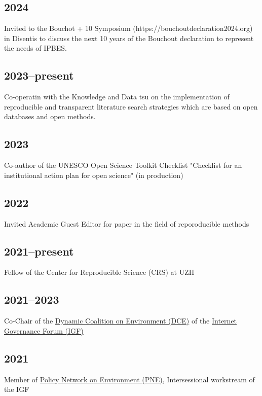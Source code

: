 \documentclass[a4paper]{article}
\begin{document}
\subsection{2024} Invited to the Bouchot + 10 Symposium 
(https://bouchoutdeclaration2024.org) in Disentis to discuss the next 10 years 
of the Bouchout declaration to represent the needs of IPBES. 

\subsection{2023--present} Co-operatin with the Knowledge and Data tsu on the 
	implementation of reproducible and transparent literature search strategies 
	which are based on open databases and open methods.

\subsection{2023}
Co-author of the UNESCO Open Science Toolkit Checklist "Checklist for an
institutional action plan for open science" (in production)

\subsection{2022}
Invited Academic Guest Editor for paper in the field of reporoducible methods

\subsection{2021--present}
Fellow of the Center for Reproducible Science (CRS) at UZH

\subsection{2021--2023}

Co-Chair of the \href{https://intgovforum.org/en/content/dynamic-coalition-on-environment-dce}{Dynamic Coalition on Environment (DCE)} of the \href{https://intgovforum.org/en}{Internet Governance Forum (IGF)}

\subsection{2021}

Member of \href{https://www.intgovforum.org/en/content/policy-network-on-environment-pne}{Policy Network on Environment (PNE)}, Intersessional workstream of the IGF
\end{document}
